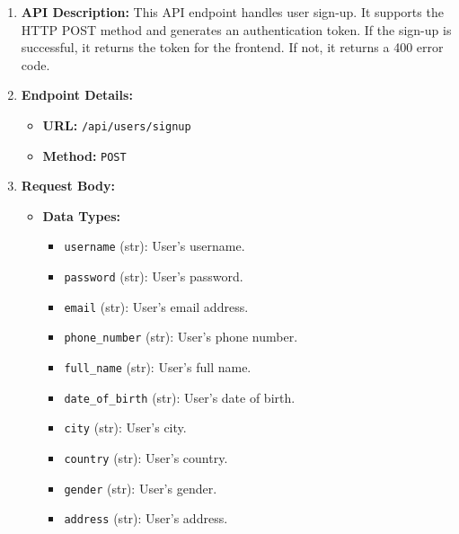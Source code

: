 \documentclass[a4 paper, 12pt]{article}
\begin{document}
\begin{enumerate}
  \item \textbf{API Description:} This API endpoint handles user sign-up. It supports the HTTP POST method and generates an authentication token. If the sign-up is successful, it returns the token for the frontend. If not, it returns a 400 error code.

  \item \textbf{Endpoint Details:}
  \begin{itemize}
    \item \textbf{URL:} \texttt{/api/users/signup}
    \item \textbf{Method:} \texttt{POST}
  \end{itemize}

  \item \textbf{Request Body:}
  \begin{itemize}
    \item \textbf{Data Types:}
    \begin{itemize}
      \item \texttt{username} (str): User's username.
      \item \texttt{password} (str): User's password.
      \item \texttt{email} (str): User's email address.
      \item \texttt{phone\_number} (str): User's phone number.
      \item \texttt{full\_name} (str): User's full name.
      \item \texttt{date\_of\_birth} (str): User's date of birth.
      \item \texttt{city} (str): User's city.
      \item \texttt{country} (str): User's country.
      \item \texttt{gender} (str): User's gender.
      \item \texttt{address} (str): User's address.
    \end{itemize}
  \end{itemize}


\end{enumerate}
\end{document}
